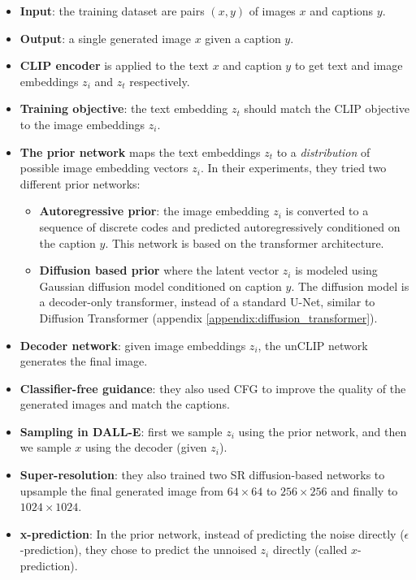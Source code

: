\begin{itemize}
    \item \textbf{Input}: the training dataset are pairs $(x,y)$ of images $x$ and captions $y$.
    \item \textbf{Output}: a single generated image $x$ given a caption $y$.
    \item \textbf{CLIP encoder} is applied to the text $x$ and caption $y$ to get text and image embeddings $z_i$ and $z_t$ respectively.
    \item \textbf{Training objective}: the text embedding $z_t$ should match the CLIP objective to the image embeddings $z_i$.
    \item \textbf{The prior network} maps the text embeddings $z_t$ to a \textit{distribution} of possible image embedding vectors $z_i$. In their experiments, they tried two different prior networks:
        \begin{itemize}
            \item \textbf{Autoregressive prior}: the image embedding $z_i$ is converted to a sequence of discrete codes and predicted autoregressively conditioned on the caption $y$. This network is based on the transformer architecture.
            \item \textbf{Diffusion based prior} where the latent vector $z_i$ is modeled using Gaussian diffusion model conditioned on caption $y$. The diffusion model is a decoder-only transformer, instead of a standard U-Net, similar to Diffusion Transformer \cite{diffusion_transformer} (appendix \ref{appendix:diffusion_transformer}).
        \end{itemize}
    \item \textbf{Decoder network}: given image embeddings $z_i$, the unCLIP network generates the final image. 
    \item \textbf{Classifier-free guidance}: they also used CFG to improve the quality of the generated images and match the captions.
    \item \textbf{Sampling in DALL-E}: first we sample $z_i$ using the prior network, and then we sample $x$ using the decoder (given $z_i$).
    \item \textbf{Super-resolution}: they also trained two SR diffusion-based networks to upsample the final generated image from $64\times 64$ to $256\times 256$ and finally to $1024\times 1024$.
    \item \textbf{x-prediction}: In the prior network, instead of predicting the noise directly ($\epsilon$-prediction), they chose to predict the unnoised $z_i$ directly (called $x$-prediction).
\end{itemize}








